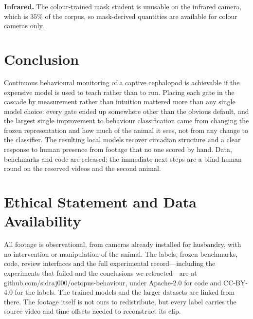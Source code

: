 \documentclass[conference]{IEEEtran}
\begin{document}
\textbf{Infrared.} The colour-trained mask student is unusable on the infrared
camera, which is $35\%$ of the corpus, so mask-derived quantities are available
for colour cameras only.

\section{Conclusion}
Continuous behavioural monitoring of a captive cephalopod is achievable if the
expensive model is used to teach rather than to run. Placing each gate in the
cascade by measurement rather than intuition mattered more than any single model
choice: every gate ended up somewhere other than the obvious default, and the
largest single improvement to behaviour classification came from changing the
frozen representation and how much of the animal it sees, not from any change to
the classifier. The resulting local models recover circadian structure and a
clear response to human presence from footage that no one scored by hand. Data,
benchmarks and code are released; the immediate next steps are a blind human
round on the reserved videos and the second animal.

\section*{Ethical Statement and Data Availability}
All footage is observational, from cameras already installed for husbandry, with
no intervention or manipulation of the animal. The labels, frozen benchmarks,
code, review interfaces and the full experimental record---including the
experiments that failed and the conclusions we retracted---are at
github.com/sidraj000/octopus-behaviour, under Apache-2.0 for code and CC-BY-4.0
for the labels. The trained models and the larger datasets are linked from
there. The footage itself is not ours to redistribute, but every label carries
the source video and time offsets needed to reconstruct its clip.
\end{document}
